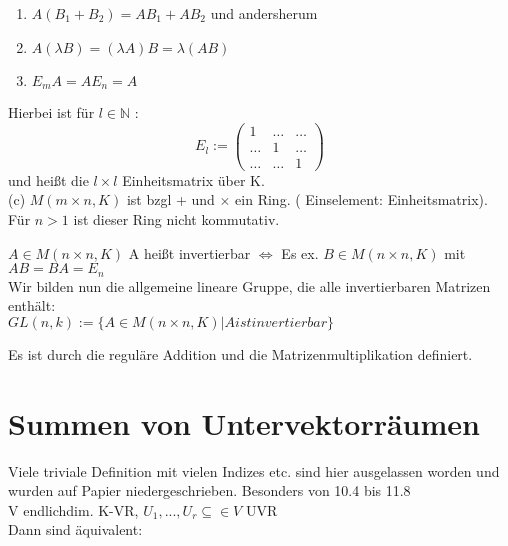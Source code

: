 \documentclass[headsepline,12pt,a4paper]{scrartcl}
\makeatletter
\def\myItem{%
   \@ifnextchar[ \@myItem{\@noitemargtrue\@myItem[\@itemlabel]}}
\def\@myItem[#1]{\item[#1]\mbox{}\\}
\makeatother
\begin{document}
\begin{enumerate}
\item $A(B_1+B_2) = AB_1+AB_2$ und andersherum \\
\item $A(\lambda B) = (\lambda A)B = \lambda (AB)$ \\
\item $E_m A = A E_n = A$ \\
\end{enumerate}

Hierbei ist für $l \in \mathbb{N}$ : \\
$$ E_l:= \begin{pmatrix}
1 & \dots & \dots \\
\dots & 1 & \dots \\
\dots & \dots & 1  
\end{pmatrix}
$$ 
und heißt die $l\times l $ Einheitsmatrix über K. \\

(c) $M(m\times n, K)$ ist bzgl + und $\times$ ein Ring. ( Einselement: Einheitsmatrix). Für $n>1$ ist dieser Ring nicht kommutativ. \\

\newpage

\myItem[10.3] $A \in M(n \times n,K)$
A heißt invertierbar $\Leftrightarrow $ Es ex. $B \in M(n \times n,K)$ mit $AB = BA = E_n$ \\

\myItem[10.4]
Wir bilden nun die allgemeine lineare Gruppe, die alle invertierbaren Matrizen enthält: \\

$GL(n,k):=\{A \in M(n \times n,K) | A ist invertierbar\}$

Es ist durch die reguläre Addition und die Matrizenmultiplikation definiert. \\

\newpage 

\section*{Summen von Untervektorräumen}

\myItem[Disclaimer:]
Viele triviale Definition mit vielen Indizes etc. sind hier ausgelassen worden und wurden auf Papier niedergeschrieben. Besonders von 10.4 bis 11.8\\

\myItem[Satz 11.8] 
V endlichdim. K-VR, $U_1,...,U_r \subseteq \in V$ UVR \\
Dann sind äquivalent: \\
\end{document}
